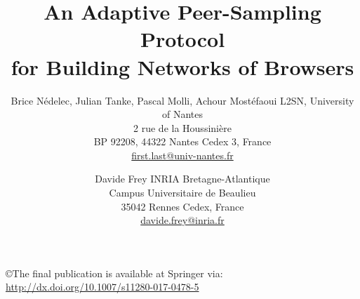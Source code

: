 \documentclass{class-for-drafts}
\begin{document}
\title{An Adaptive Peer-Sampling Protocol\\for Building Networks of Browsers}

\newcommand{\affLSNN}{L2SN, University of Nantes\\
  2 rue de la Houssini{\`e}re\\
  BP 92208, 44322 Nantes Cedex 3, France\\
  \url{first.last@univ-nantes.fr}}

\newcommand{\affINRIA}{INRIA Bretagne-Atlantique\\
  Campus Universitaire de Beaulieu \\
  35042 Rennes Cedex, France\\
  \url{davide.frey@inria.fr}}


\author{Brice N{\'e}delec, Julian Tanke, Pascal Molli, Achour Most{\'e}faoui
  \aff \affLSNN \and Davide Frey \aff \affINRIA}


\copyright{The final publication is available at Springer via:\\
  \url{http://dx.doi.org/10.1007/s11280-017-0478-5}}



\maketitle













\clearpage
  
\end{document}
